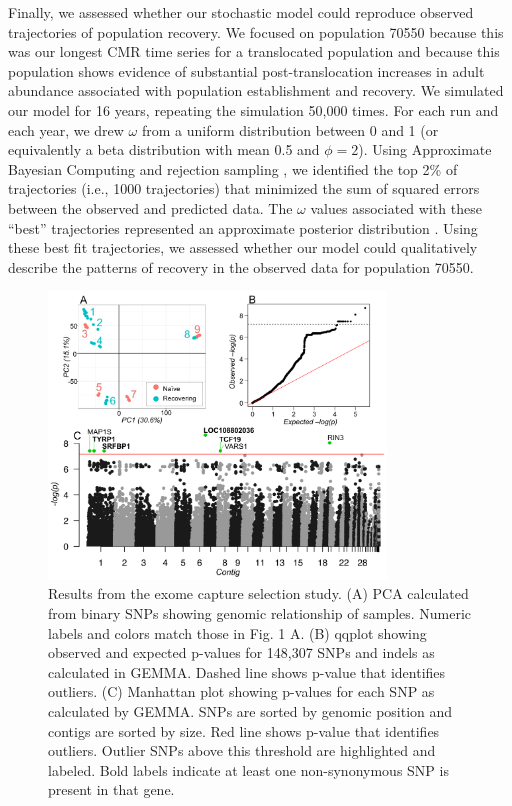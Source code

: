 \documentclass[9pt,twoside,lineno]{pnas-new}
\begin{document}
Finally, we assessed whether our stochastic model could reproduce
observed trajectories of population recovery. We focused on population
70550 because this was our longest CMR time series for a translocated
population and because this population shows evidence of substantial
post-translocation increases in adult abundance associated with
population establishment and recovery. We simulated our model for 16
years, repeating the simulation 50,000 times. For each run and each
year, we drew \(\omega\) from a uniform distribution between 0 and 1 (or
equivalently a beta distribution with mean 0.5 and \(\phi = 2\)). Using
Approximate Bayesian Computing and rejection sampling
\citep{kosmala2016}, we identified the top 2\% of trajectories (i.e.,
1000 trajectories) that minimized the sum of squared errors between the
observed and predicted data. The \(\omega\) values associated with these
``best'' trajectories represented an approximate posterior distribution
\citep{beaumont2010}. Using these best fit trajectories, we assessed
whether our model could qualitatively describe the patterns of recovery
in the observed data for population 70550.

\newpage

\hfill\break

\begin{figure}

{\centering \includegraphics[width=0.8\textwidth]{figures/pca_qq_manhattan.png}

}

\caption{\label{fig-selectionresults}Results from the exome capture
selection study. (A) PCA calculated from binary SNPs showing genomic
relationship of samples. Numeric labels and colors match those in
Fig. 1 A. (B) qqplot showing observed and
expected p-values for 148,307 SNPs and indels as calculated in GEMMA.
Dashed line shows p-value that identifies outliers. (C) Manhattan plot
showing p-values for each SNP as calculated by GEMMA. SNPs are sorted by
genomic position and contigs are sorted by size. Red line shows p-value
that identifies outliers. Outlier SNPs above this threshold are
highlighted and labeled. Bold labels indicate at least one
non-synonymous SNP is present in that gene.}

\end{figure}\clearpage
\end{document}
